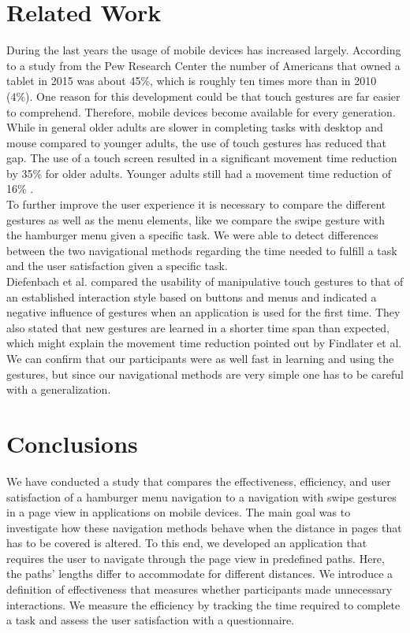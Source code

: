 \documentclass{sig-alternate-05-2015}
\begin{document}
\section{Related Work}
During the last years the usage of mobile devices has increased largely. According to a study from the Pew Research Center
the number of Americans that owned a tablet in 2015 was about 45\%, which is roughly ten times more than in 2010 (4\%). One reason
for this development could be that touch gestures are far easier to comprehend. Therefore, mobile devices become available for every generation. While in general older adults are slower in completing tasks with desktop and mouse compared to younger adults, the use of touch gestures has reduced that gap. The use of a touch screen resulted in a significant movement time reduction by 35\% for older adults. Younger adults still had a movement time reduction of 16\% \cite{findlater2013age}.\\ To further improve the user experience it is necessary to compare the different gestures as well as the menu elements, like we compare the swipe gesture with the hamburger menu given a specific task. We were able to detect differences between the two navigational methods regarding the time needed to fulfill a task and the user satisfaction given a specific task.\\ Diefenbach et al. \cite{heuwing2015usability} compared the usability of manipulative touch gestures to that of an established interaction style based on buttons and menus and indicated a negative influence of gestures when an application is used for the first time. They also stated that new gestures are learned in a shorter time span than expected, which might explain the movement time reduction pointed out by Findlater
et al. We can confirm that our participants were as well fast in learning and using the gestures, but since our navigational methods are very simple one has to be careful with a generalization.
\section{Conclusions}
We have conducted a study that compares the effectiveness, efficiency, and user satisfaction of a hamburger menu navigation to a navigation with swipe
gestures in a page view in applications on mobile devices. The main goal was to investigate how these navigation methods behave when the distance in pages
that has to be covered is altered. To this end, we developed an application that requires the user to navigate through the page view in predefined
paths. Here, the paths' lengths differ to accommodate for different distances. We introduce a definition of effectiveness that measures whether participants made unnecessary interactions. We measure the efficiency by tracking the time
required to complete a task and assess the user satisfaction with a questionnaire.
\end{document}
